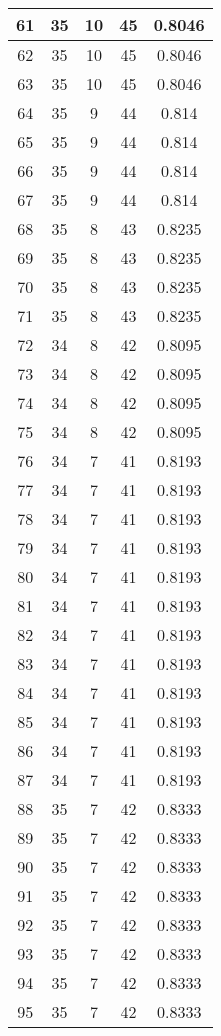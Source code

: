 \documentclass[letterpaper, 12pt]{article}
\begin{document}
\begin{longtable}{|c|c|c|c|c|}
\hline
61 & 35 & 10 & 45 & 0.8046 \\
\hline
62 & 35 & 10 & 45 & 0.8046 \\
\hline
63 & 35 & 10 & 45 & 0.8046 \\
\hline
64 & 35 & 9 & 44 & 0.814 \\
\hline
65 & 35 & 9 & 44 & 0.814 \\
\hline
66 & 35 & 9 & 44 & 0.814 \\
\hline
67 & 35 & 9 & 44 & 0.814 \\
\hline
68 & 35 & 8 & 43 & 0.8235 \\
\hline
69 & 35 & 8 & 43 & 0.8235 \\
\hline
70 & 35 & 8 & 43 & 0.8235 \\
\hline
71 & 35 & 8 & 43 & 0.8235 \\
\hline
72 & 34 & 8 & 42 & 0.8095 \\
\hline
73 & 34 & 8 & 42 & 0.8095 \\
\hline
74 & 34 & 8 & 42 & 0.8095 \\
\hline
75 & 34 & 8 & 42 & 0.8095 \\
\hline
76 & 34 & 7 & 41 & 0.8193 \\
\hline
77 & 34 & 7 & 41 & 0.8193 \\
\hline
78 & 34 & 7 & 41 & 0.8193 \\
\hline
79 & 34 & 7 & 41 & 0.8193 \\
\hline
80 & 34 & 7 & 41 & 0.8193 \\
\hline
81 & 34 & 7 & 41 & 0.8193 \\
\hline
82 & 34 & 7 & 41 & 0.8193 \\
\hline
83 & 34 & 7 & 41 & 0.8193 \\
\hline
84 & 34 & 7 & 41 & 0.8193 \\
\hline
85 & 34 & 7 & 41 & 0.8193 \\
\hline
86 & 34 & 7 & 41 & 0.8193 \\
\hline
87 & 34 & 7 & 41 & 0.8193 \\
\hline
88 & 35 & 7 & 42 & 0.8333 \\
\hline
89 & 35 & 7 & 42 & 0.8333 \\
\hline
90 & 35 & 7 & 42 & 0.8333 \\
\hline
91 & 35 & 7 & 42 & 0.8333 \\
\hline
92 & 35 & 7 & 42 & 0.8333 \\
\hline
93 & 35 & 7 & 42 & 0.8333 \\
\hline
94 & 35 & 7 & 42 & 0.8333 \\
\hline
95 & 35 & 7 & 42 & 0.8333 \\

\end{longtable}
\end{document}
